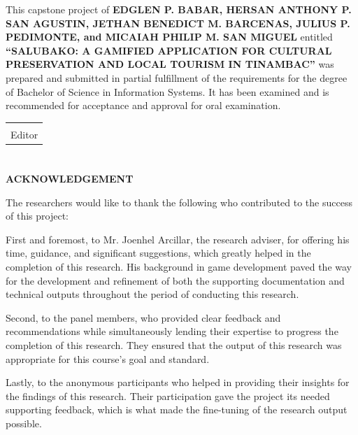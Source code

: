 \documentclass{research}
\newcommand{\frontmattertitle}[1]{%
  \begin{center}
    {\normalsize\bfseries #1}\par
  \end{center}
  \vspace{1.25em}
}
\begin{document}
\vspace{0.5em}

\noindent
This capstone project of \textbf{EDGLEN P. BABAR, HERSAN ANTHONY P. SAN AGUSTIN,
JETHAN BENEDICT M. BARCENAS, JULIUS P. PEDIMONTE, and MICAIAH PHILIP M. SAN MIGUEL}
entitled \textbf{``SALUBAKO: A GAMIFIED APPLICATION FOR CULTURAL PRESERVATION AND LOCAL
TOURISM IN TINAMBAC''} was prepared and submitted in partial fulfillment of the
requirements for the degree of Bachelor of Science in Information Systems.
It has been examined and is recommended for acceptance and approval for oral
examination.

\vspace{4em}

\noindent
\begin{tabular}{p{7cm}}
  \underline{\hspace{7cm}} \\
  Editor \\
\end{tabular}

\clearpage

\chapter*{}
\frontmattertitle{ACKNOWLEDGEMENT}

The researchers would like to thank the following who contributed to the success of this project:

First and foremost, to Mr. Joenhel Arcillar, the research adviser, for offering his time, guidance, and significant suggestions, which greatly helped in the completion of this research. His background in game development paved the way for the development and refinement of both the supporting documentation and technical outputs throughout the period of conducting this research.

Second, to the panel members, who provided clear feedback and recommendations while simultaneously lending their expertise to progress the completion of this research. They ensured that the output of this research was appropriate for this course's goal and standard.

Lastly, to the anonymous participants who helped in providing their insights for the findings of this research. Their participation gave the project its needed supporting feedback, which is what made the fine-tuning of the research output possible.
\end{document}
